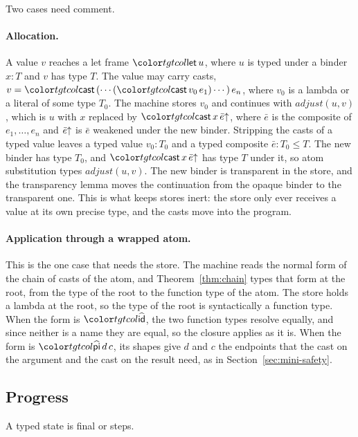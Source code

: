 Two cases need comment.

\paragraph{Allocation.}
A value $v$ reaches a let frame $\ev{let}\,u$, where $u$ is typed under a binder $x : T$ and $v$ has type $T$. The value may carry casts, $v = \ev{cast}\,(\cdots(\ev{cast}\,v_0\,e_1)\cdots)\,e_n$, where $v_0$ is a lambda or a literal of some type $T_0$. The machine stores $v_0$ and continues with $\mathit{adjust}(u, v)$, which is $u$ with $x$ replaced by $\ev{cast}\,x\,\weak{\bar{e}}$, where $\bar{e}$ is the composite of $e_1, \ldots, e_n$ and $\bar{e}{\uparrow}$ is $\bar{e}$ weakened under the new binder. Stripping the casts of a typed value leaves a typed value $v_0 : T_0$ and a typed composite $\bar{e} : T_0 \le T$. The new binder has type $T_0$, and $\ev{cast}\,x\,\weak{\bar{e}}$ has type $T$ under it, so atom substitution types $\mathit{adjust}(u, v)$. The new binder is transparent in the store, and the transparency lemma moves the continuation from the opaque binder to the transparent one. This is what keeps stores inert: the store only ever receives a value at its own precise type, and the casts move into the program.

\paragraph{Application through a wrapped atom.}
This is the one case that needs the store. The machine reads the normal form of the chain of casts of the atom, and Theorem~\ref{thm:chain} types that form at the root, from the type of the root to the function type of the atom. The store holds a lambda at the root, so the type of the root is syntactically a function type. When the form is $\form{id}$, the two function types resolve equally, and since neither is a name they are equal, so the closure applies as it is. When the form is $\form{pi}\,d\,c$, its shapes give $d$ and $c$ the endpoints that the cast on the argument and the cast on the result need, as in Section~\ref{sec:mini-safety}.

\subsection{Progress}

\begin{theorem}[Progress]
A typed state is final or steps.
\end{theorem}

